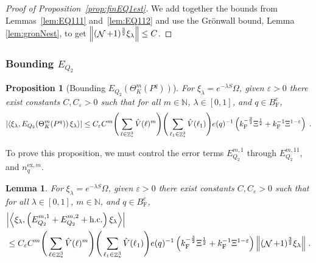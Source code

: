 \documentclass[12pt,a4paper]{article}
\numberwithin{equation}{section}
\newcommand{\NNN}{\mathbb{N}}
\newcommand{\1}{\mathbb{I}}
\newcommand{\ex}{\mathrm{ex}}
\newcommand{\F}{\mathrm{F}}
\DeclareMathOperator{\Z}{\mathbb{Z}}
\DeclareMathOperator{\NN}{\mathcal{N}}
\newcommand{\half}{\frac{1}{2}}
\newcommand{\eva}[1]{\left\langle #1 \right\rangle}
\theoremstyle{plain}
\newtheorem{lemma}[theorem]{Lemma}
\newtheorem{proposition}[theorem]{Proposition}
\theoremstyle{definition}
\theoremstyle{remark}
\theoremstyle{plain}
\theoremstyle{definition}
\theoremstyle{remark}
\begin{document}
\begin{proof}[Proof of Proposition~\ref{prop:finEQ1est}]
We add together the bounds from Lemmas~\ref{lem:EQ111} and~\ref{lem:EQ112} and use the Gr\"onwall bound, Lemma \ref{lem:gronNest}, to get $ \norm{(\NN+1)^{\frac 32} \xi_\lambda} \le C $.
\end{proof}






\subsubsection{Bounding $E_{Q_2}$}


\begin{proposition}[Bounding $E_{Q_2}(\Theta^m_{K}(P^q))$]\label{prop:finEQ2est}
For $\xi_\lambda = e^{-\lambda S} \Omega$, given $ \varepsilon > 0 $ there exist constants $ C, C_\varepsilon > 0 $ such that for all $ m \in \NNN $, $ \lambda \in [0,1] $, and $ q \in B_{\F}^c $,
\begin{equation}\label{eq:finEQ2est}
	\abs{\eva{\xi_\lambda, E_{Q_2}\!\left(\Theta^m_K(P^q)\right) \xi_\lambda}} 
	\leq C_\varepsilon C^m \Bigg(\sum_{\ell \in \Z^3_*} \hat{V}(\ell)^m\Bigg)
		\Bigg( \sum_{\ell_1 \in \Z^3_*} \hat{V}(\ell_1) \Bigg)
		e(q)^{-1} \left( k_{\F}^{-\frac{3}{2}} \Xi^\half
		+ k_{\F}^{-1} \Xi^{1-\varepsilon} \right) \;. \\
\end{equation}
\end{proposition}

To prove this proposition, we must control the error terms $ E^{m,1}_{Q_2} $ through $ E^{m,11}_{Q_2} $, and $ n_q^{\ex,m} $.


\begin{lemma} \label{lem:EQ211}
For $\xi_\lambda = e^{-\lambda S} \Omega$, given $ \varepsilon > 0 $ there exist constants $ C, C_\varepsilon > 0 $ such that for all $ \lambda \in [0,1] $, $ m \in \NNN $, and $ q \in B_{\F}^c $,
\begin{align}
	&\abs{\eva{\xi_\lambda,\left(E^{m,1}_{Q_2}+E^{m,2}_{Q_2}+\mathrm{h.c.}\right) \xi_\lambda }} \nonumber \\
	&\leq C_\varepsilon C^m \Bigg(\sum_{\ell \in \Z^3_*} \hat{V}(\ell)^m\Bigg)
		\Bigg( \sum_{\ell_1 \in \Z^3_*} \hat{V}(\ell_1) \Bigg)
		e(q)^{-1} \left( k_{\F}^{-\frac{3}{2}} \Xi^\half 
		+ k_{\F}^{-1}\Xi^{1-\varepsilon} \right)
		\norm { (\NN+1)^{\frac 32} \xi_\lambda } \;. \label{eq:estEQ211}
\end{align}
\end{lemma}
\end{document}
